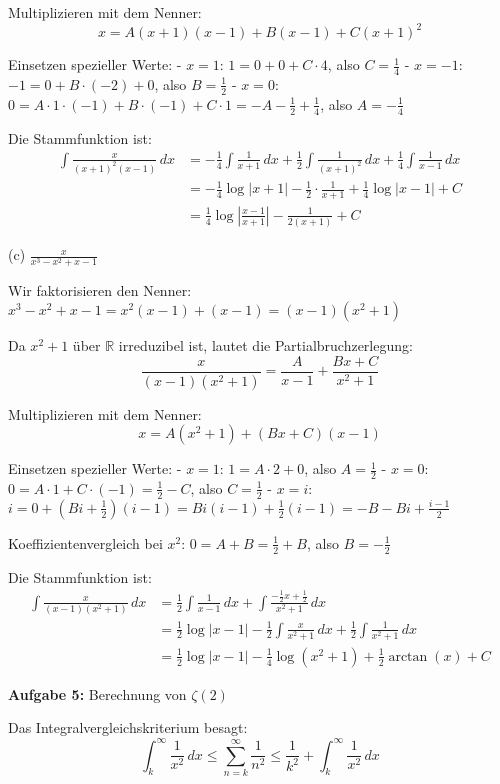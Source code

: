\documentclass{article}
\begin{document}
Multiplizieren mit dem Nenner:
$$x = A(x+1)(x-1) + B(x-1) + C(x+1)^2$$

Einsetzen spezieller Werte:
- $x = 1$: $1 = 0 + 0 + C \cdot 4$, also $C = \frac{1}{4}$
- $x = -1$: $-1 = 0 + B \cdot (-2) + 0$, also $B = \frac{1}{2}$
- $x = 0$: $0 = A \cdot 1 \cdot (-1) + B \cdot (-1) + C \cdot 1 = -A - \frac{1}{2} + \frac{1}{4}$, also $A = -\frac{1}{4}$

Die Stammfunktion ist:
\begin{align}
\int \frac{x}{(x+1)^2(x-1)}\,dx &= -\frac{1}{4}\int \frac{1}{x+1}\,dx + \frac{1}{2}\int \frac{1}{(x+1)^2}\,dx + \frac{1}{4}\int \frac{1}{x-1}\,dx \\
&= -\frac{1}{4}\log|x+1| - \frac{1}{2} \cdot \frac{1}{x+1} + \frac{1}{4}\log|x-1| + C \\
&= \frac{1}{4}\log\left|\frac{x-1}{x+1}\right| - \frac{1}{2(x+1)} + C
\end{align}

(c) $\frac{x}{x^3-x^2+x-1}$

Wir faktorisieren den Nenner:
$x^3 - x^2 + x - 1 = x^2(x-1) + (x-1) = (x-1)(x^2+1)$

Da $x^2 + 1$ über $\mathbb{R}$ irreduzibel ist, lautet die Partialbruchzerlegung:
$$\frac{x}{(x-1)(x^2+1)} = \frac{A}{x-1} + \frac{Bx+C}{x^2+1}$$

Multiplizieren mit dem Nenner:
$$x = A(x^2+1) + (Bx+C)(x-1)$$

Einsetzen spezieller Werte:
- $x = 1$: $1 = A \cdot 2 + 0$, also $A = \frac{1}{2}$
- $x = 0$: $0 = A \cdot 1 + C \cdot (-1) = \frac{1}{2} - C$, also $C = \frac{1}{2}$
- $x = i$: $i = 0 + (Bi + \frac{1}{2})(i-1) = Bi(i-1) + \frac{1}{2}(i-1) = -B - Bi + \frac{i-1}{2}$

Koeffizientenvergleich bei $x^2$: $0 = A + B = \frac{1}{2} + B$, also $B = -\frac{1}{2}$

Die Stammfunktion ist:
\begin{align}
\int \frac{x}{(x-1)(x^2+1)}\,dx &= \frac{1}{2}\int \frac{1}{x-1}\,dx + \int \frac{-\frac{1}{2}x + \frac{1}{2}}{x^2+1}\,dx \\
&= \frac{1}{2}\log|x-1| - \frac{1}{2}\int \frac{x}{x^2+1}\,dx + \frac{1}{2}\int \frac{1}{x^2+1}\,dx \\
&= \frac{1}{2}\log|x-1| - \frac{1}{4}\log(x^2+1) + \frac{1}{2}\arctan(x) + C
\end{align}

\textbf{Aufgabe 5:} Berechnung von $\zeta(2)$

Das Integralvergleichskriterium besagt:
$$\int_k^\infty \frac{1}{x^2}\,dx \leq \sum_{n=k}^\infty \frac{1}{n^2} \leq \frac{1}{k^2} + \int_k^\infty \frac{1}{x^2}\,dx$$
\end{document}
